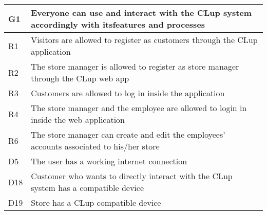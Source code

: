 \begin{center}
    {\renewcommand{\arraystretch}{1.5}
    \begin{longtable}{L{2cm}L{12cm}}
        \hline
        \textbf{G1} & \textbf{Everyone can use and interact with the CLup system accordingly with itsfeatures and processes} \\
        \hline
         R1 & Visitors are allowed to register as customers through the CLup application \\
        \hline
         R2 & The store manager is allowed to register as store manager through the CLup web app \\
        \hline
         R3 & Customers are allowed to log in inside the application \\
        \hline
         R4 & The store manager and the employee are allowed to login in inside the web application \\
        \hline
         R6 & The store manager can create and edit the employees’ accounts associated to his/her store \\
        \hline
         D5 & The user has a working internet connection \\
        \hline
         D18 & Customer who wants to directly interact with the CLup system has a compatible device \\
        \hline
         D19 & Store has a CLup compatible device \\
        \hline
    \end{longtable}}


\end{center}
